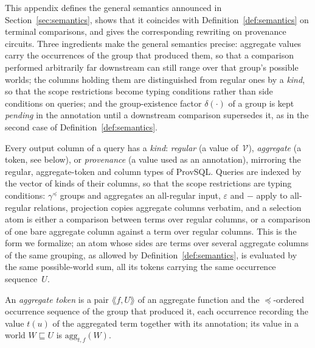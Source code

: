 \begin{toappendix}
\label{appendix:semantics}
This appendix defines the general semantics announced in
Section~\ref{sec:semantics}, shows that it coincides with
Definition~\ref{def:semantics} on terminal comparisons, and gives the
corresponding rewriting on provenance circuits.
Three ingredients make the general semantics precise: aggregate values
carry the occurrences of the group that produced them, so that a
comparison performed arbitrarily far downstream can still range over that
group's possible worlds; the columns holding them are distinguished from
regular ones by a \emph{kind}, so that the scope restrictions become
typing conditions rather than side conditions on queries; and the
group-existence factor $\delta(\cdot)$ of a group is kept \emph{pending}
in the annotation until a downstream comparison supersedes it, as in the
second case of Definition~\ref{def:semantics}.

\begin{definition}\label{def:general}
Every output column of a query has a \emph{kind}: \emph{regular} (a value
of~$\mathcal V$),
\emph{aggregate} (a token, see below), or \emph{provenance} (a value used
as an annotation), mirroring the regular, aggregate-token and 
column types of ProvSQL. Queries are indexed by the vector of kinds of
their columns, so that the scope restrictions
are typing conditions: $\gamma^{\preceq}$ groups and aggregates an
all-regular input, $\varepsilon$ and $-$ apply to all-regular relations,
projection copies aggregate columns verbatim, and a selection atom is
either a comparison between terms over regular columns, or a comparison
of one bare aggregate column against a term over regular columns. This
is the form we formalize; an atom whose sides are terms over several
aggregate columns of the same grouping, as allowed by
Definition~\ref{def:semantics}, is evaluated by the same possible-world
sum, all its tokens carrying the same occurrence sequence~$U$.

An \emph{aggregate token} is a pair
$\lAngle f, U\rAngle$ of an aggregate function and the $\preceq$-ordered
occurrence sequence of the group that produced it, each occurrence
recording the value $t(u)$ of the aggregated term together with its
annotation; its value in a world $W\sqsubseteq U$ is
$\mathrm{agg}_{t,f}(W)$.


\end{definition}
\end{toappendix}
